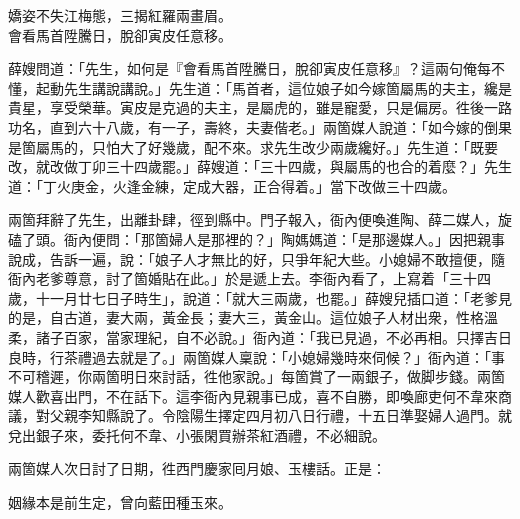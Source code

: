 \begin{myquote}
嬌姿不失江梅態，三揭紅羅兩畫眉。\\會看馬首陞騰日，脫卻寅皮任意移。
\end{myquote}

薛嫂問道：「先生，如何是『會看馬首陞騰日，脫卻寅皮任意移』？這兩句俺每不懂，起動先生講說講說。」先生道：「馬首者，這位娘子如今嫁箇屬馬的夫主，纔是貴星，享受榮華。寅皮是克過的夫主，是屬虎的，雖是寵愛，只是偏房。徃後一路功名，直到六十八歲，有一子，壽終，夫妻偕老。」兩箇媒人說道：「如今嫁的倒果是箇屬馬的，只怕大了好幾歲，配不來。求先生改少兩歲纔好。」先生道：「既要改，就改做丁卯三十四歲罷。」薛嫂道：「三十四歲，與屬馬的也合的着麼？」先生道：「丁火庚金，火逢金練，定成大器，正合得着。」當下改做三十四歲。

兩箇拜辭了先生，出離卦肆，徑到縣中。門子報入，衙內便喚進陶、薛二媒人，旋磕了頭。衙內便問：「那箇婦人是那裡的？」陶媽媽道：「是那邊媒人。」因把親事說成，告訴一遍，說：「娘子人才無比的好，只爭年紀大些。小媳婦不敢擅便，隨衙內老爹尊意，討了箇婚貼在此。」於是遞上去。李衙內看了，上寫着「三十四歲，十一月廿七日子時生」，說道：「就大三兩歲，也罷。」薛嫂兒插口道：「老爹見的是，自古道，妻大兩，黃金長；妻大三，黃金山。{}這位娘子人材出衆，性格溫柔，諸子百家，當家理紀，自不必說。」衙內道：「我已見過，不必再相。只擇吉日良時，行茶禮過去就是了。」兩箇媒人稟說：「小媳婦幾時來伺候？」衙內道：「事不可稽遲，你兩箇明日來討話，徃他家說。」每箇賞了一兩銀子，做脚步錢。兩箇媒人歡喜出門，不在話下。這李衙內見親事已成，喜不自勝，即喚廊吏何不韋來商議，對父親李知縣說了。令陰陽生擇定四月初八日行禮，十五日準娶婦人過門。就兌出銀子來，委托何不韋、小張閑買辦茶紅酒禮，不必細說。

兩箇媒人次日討了日期，徃西門慶家囘月娘、玉樓話。正是：

\begin{myquote}
姻緣本是前生定，曾向藍田種玉來。
\end{myquote}

